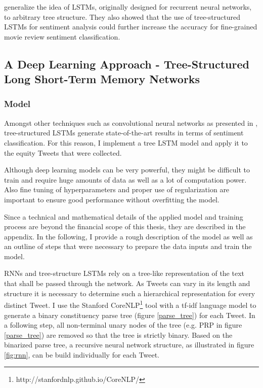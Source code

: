 \documentclass[a4paper,12pt]{article}%
\begin{document}
\cite{Tai2015} generalize the idea of LSTMs, originally designed for recurrent neural networks, to arbitrary tree structure. They also showed that the use of tree-structured LSTMs for sentiment analysis could further increase the accuracy for fine-grained movie review sentiment classification.

\subsection{A Deep Learning Approach - Tree-Structured Long Short-Term Memory Networks \label{tree_lstm}}

\subsubsection{Model}
Amongst other techniques such as convolutional neural networks as presented in \citet{Kim2014}, tree-structured LSTMs generate state-of-the-art results in terms of sentiment classification. For this reason, I implement a tree LSTM model and apply it to the equity Tweets that were collected.

Although deep learning models can be very powerful, they might be difficult to train and require huge amounts of data as well as a lot of computation power. Also fine tuning of hyperparameters and proper use of regularization are important to ensure good performance without overfitting the model.

Since a technical and mathematical details of the applied model and training process are beyond the financial scope of this thesis, they are described in the appendix. In the following, I provide a rough description of the model as well as an outline of steps that were necessary to prepare the data inputs and train the model.

RNNs and tree-structure LSTMs rely on a tree-like representation of the text that shall be passed through the network. As Tweets can vary in its length and structure it is necessary to determine such a hierarchical representation for every distinct Tweet. I use the Stanford CoreNLP\footnote{http://stanfordnlp.github.io/CoreNLP/} tool with a tf-idf language model to generate a binary constituency parse tree (figure \ref{parse_tree}) for each Tweet. In a following step, all non-terminal unary nodes of the tree (e.g. PRP in figure \ref{parse_tree}) are removed so that the tree is strictly binary. Based on the binarized parse tree, a recursive neural network structure, as illustrated in figure \ref{fig:rnn}, can be build individually for each Tweet.
\end{document}
